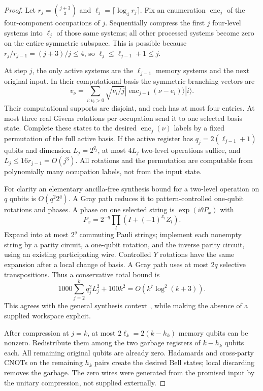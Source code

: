 \begin{proof}
Let $r_j=\binom{j+3}{3}$ and $\ell_j=\lceil\log_4 r_j\rceil$. Fix an enumeration $\operatorname{enc}_j$ of the four-component occupations of $j$. Sequentially compress the first $j$ four-level systems into $\ell_j$ of those same systems; all other processed systems become zero on the entire symmetric subspace. This is possible because $r_j/r_{j-1}=(j+3)/j\le4$, so $\ell_j\le\ell_{j-1}+1\le j$.

At step $j$, the only active systems are the $\ell_{j-1}$ memory systems and the next original input. In their computational basis the symmetric branching vectors are
\[
 v_\nu=\sum_{i:\nu_i>0}\sqrt{\nu_i/j}
 |\operatorname{enc}_{j-1}(\nu-e_i)\rangle|i\rangle.
\]
Their computational supports are disjoint, and each has at most four entries. At most three real Givens rotations per occupation send it to one selected basis state. Complete these states to the desired $\operatorname{enc}_j(\nu)$ labels by a fixed permutation of the full active basis. If the active register has $q_j=2(\ell_{j-1}+1)$ qubits and dimension $L_j=2^{q_j}$, at most $4L_j$ two-level operations suffice, and $L_j\le16r_{j-1}=O(j^3)$. All rotations and the permutation are computable from polynomially many occupation labels, not from the input state.

For clarity an elementary ancilla-free synthesis bound for a two-level operation on $q$ qubits is $O(q^2 2^q)$. A Gray path reduces it to pattern-controlled one-qubit rotations and phases. A phase on one selected string is $\exp(i\theta P_x)$ with
\[
 P_x=2^{-q}\prod_l(I+(-1)^{x_l}Z_l).
\]
Expand into at most $2^q$ commuting Pauli strings; implement each nonempty string by a parity circuit, a one-qubit rotation, and the inverse parity circuit, using an existing participating wire. Controlled $Y$ rotations have the same expansion after a local change of basis. A Gray path uses at most $2q$ selective transpositions. Thus a conservative total bound is
\[
 1000\sum_{j=2}^k q_j^2L_j^2+100k^2=O(k^7\log^2(k+3)).
\]
This agrees with the general synthesis context \cite{barenco,shende}, while making the absence of a supplied workspace explicit.

After compression at $j=k$, at most $2\ell_k=2(k-h_k)$ memory qubits can be nonzero. Redistribute them among the two garbage registers of $k-h_k$ qubits each. All remaining original qubits are already zero. Hadamards and cross-party CNOTs on the remaining $h_k$ pairs create the desired Bell states; local discarding removes the garbage. The zero wires were generated from the promised input by the unitary compression, not supplied externally.


\end{proof}
